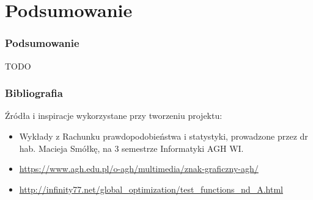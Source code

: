 \documentclass{lab}
\begin{document}
\newpage
\part{Podsumowanie}
\section{Podsumowanie}
TODO

\newpage
\section{Bibliografia}
Źródła i inspiracje wykorzystane przy tworzeniu projektu:
\begin{itemize}
  \item Wykłady z Rachunku prawdopodobieństwa i statystyki, prowadzone przez dr hab. Macieja Smółkę, na 3 semestrze Informatyki AGH WI.
  \item \url{https://www.agh.edu.pl/o-agh/multimedia/znak-graficzny-agh/}
  \item \url{http://infinity77.net/global_optimization/test_functions_nd_A.html}
\end{itemize}
\end{document}
